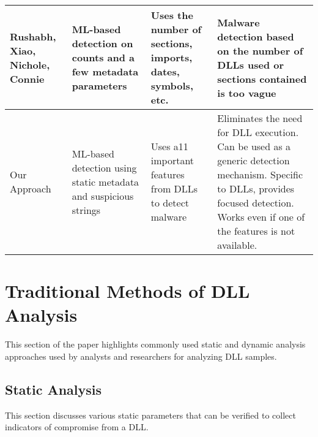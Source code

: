 \documentclass{article}
\begin{document}
\begin{table}[htbp]
\begin{tabular}{|p{3cm}|p{3cm}|p{3.5cm}|p{4cm}|}
        \hline
        Rushabh, Xiao, Nichole, Connie\cite{rushabh_xiao_nichole_connie} & ML-based detection on counts and a few metadata parameters & Uses the number of sections, imports, dates, symbols, etc. & Malware detection based on the number of DLLs used or sections contained is too vague \\
        \hline
        Our Approach & ML-based detection using static metadata and suspicious strings & Uses a11 important features from DLLs to detect malware & Eliminates the need for DLL execution.
            Can be used as a generic detection mechanism.
            Specific to DLLs, provides focused detection.
            Works even if one of the features is not available. \\
        \hline
        \end{tabular}
\end{table}

\section{Traditional Methods of DLL Analysis}

This section of the paper highlights commonly used static and dynamic analysis approaches used by analysts and researchers for analyzing DLL samples.

\subsection{Static Analysis}

This section discusses various static parameters that can be verified to collect indicators of compromise from a DLL.
\end{document}

